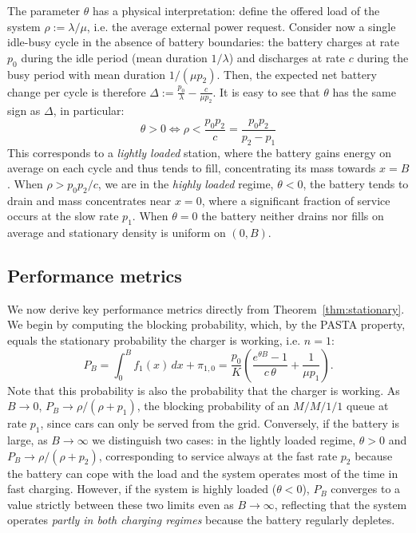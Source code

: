\documentclass{sig-alternate-per-modified}
\begin{document}
The parameter $\theta$ has a physical interpretation: define the offered load of the system $\rho:=\lambda/\mu$, i.e. the average external power request. Consider now a single idle-busy cycle in the absence of battery boundaries: the battery
charges at rate $p_0$ during the idle period (mean duration $1/\lambda$) and discharges
at rate $c$ during the busy period with mean duration $1/(\mu p_2)$. Then, the expected net
battery change per cycle is therefore $\Delta := \frac{p_0}{\lambda} - \frac{c}{\mu p_2}$. It is easy to see that $\theta$ has the same sign as $\Delta$, in particular:
\begin{equation*}
  \theta > 0 \Leftrightarrow \rho < \frac{p_0p_2}{c} = \frac{p_0 p_2}{p_2-p_1}
\end{equation*}
This corresponds to a \emph{lightly loaded} station, where the battery gains energy on average on each cycle and thus tends to fill, concentrating its mass towards $x=B$. When $\rho > p_0 p_2/c$, we are in the \emph{highly loaded} regime, $\theta < 0$, the battery tends to drain and mass concentrates near $x = 0$, where a significant fraction of service occurs at the slow
rate $p_1$. When $\theta = 0$ the battery neither drains nor fills on average and stationary density is uniform on $(0, B)$.

\subsection{Performance metrics}\label{ssec:metrics}

We now derive key performance metrics directly from Theorem~\ref{thm:stationary}. We begin by computing the blocking probability, which, by the PASTA property, equals the stationary probability the charger is working, i.e. $n=1$:
\begin{equation}
  P_B = \int_0^B f_1(x)\,dx + \pi_{1,0}
      = \frac{p_0}{K}\left(\frac{e^{\theta B}-1}{c\,\theta} + \frac{1}{\mu p_1}\right).
  \label{eq:PB}
\end{equation}
Note that this probability is also the probability that the charger is working. As $B \to 0$, $P_B \to \rho/(\rho + p_1)$, the blocking probability of an $M/M/1/1$ queue at rate $p_1$, since cars can only be served from the grid. Conversely, if the battery is large, as $B \to \infty$ we distinguish two cases: in the lightly loaded regime, $\theta > 0$ and $P_B \to \rho/(\rho + p_2)$, corresponding to service always at the fast rate $p_2$ because the battery can cope with the load and the system operates most of the time in fast charging. However, if the system is highly loaded ($\theta < 0$), $P_B$ converges to a value strictly between these two limits even as $B \to \infty$, reflecting that the system operates \emph{partly in both charging regimes} because the battery regularly depletes.
\end{document}
